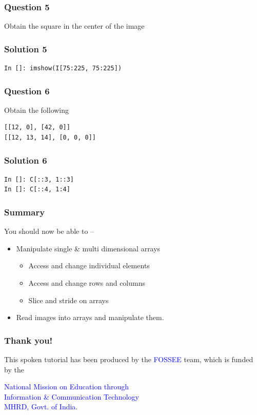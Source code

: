 \documentclass[presentation]{beamer}
\begin{document}
\begin{frame}
\frametitle{Question 5}
\label{sec-12}

  Obtain the square in the center of the image
\end{frame}
\begin{frame}[fragile]
\frametitle{Solution 5}
\label{sec-13}

\lstset{language=Python}
\begin{lstlisting}
In []: imshow(I[75:225, 75:225])
\end{lstlisting}
\end{frame}
\begin{frame}[fragile]
\frametitle{Question 6}
\label{sec-14}

  Obtain the following
\lstset{language=Python}
\begin{lstlisting}
[[12, 0], [42, 0]]
[[12, 13, 14], [0, 0, 0]]
\end{lstlisting}
\end{frame}
\begin{frame}[fragile]
\frametitle{Solution 6}
\label{sec-15}

\lstset{language=Python}
\begin{lstlisting}
In []: C[::3, 1::3]
In []: C[::4, 1:4]
\end{lstlisting}
\end{frame}
\begin{frame}
\frametitle{Summary}
\label{sec-16}

  You should now be able to --
\begin{itemize}
\item Manipulate single \& multi dimensional arrays

\begin{itemize}
\item Access and change individual elements
\item Access and change rows and columns
\item Slice and stride on arrays
\end{itemize}

\item Read images into arrays and manipulate them.
\end{itemize}
\end{frame}
\begin{frame}
\frametitle{Thank you!}
\label{sec-17}

  \begin{block}{}
  \begin{center}
  This spoken tutorial has been produced by the
  \textcolor{blue}{FOSSEE} team, which is funded by the 
  \end{center}
  \begin{center}
    \textcolor{blue}{National Mission on Education through \\
      Information \& Communication Technology \\ 
      MHRD, Govt. of India}.
  \end{center}  
  \end{block}
\end{frame}
\end{document}

